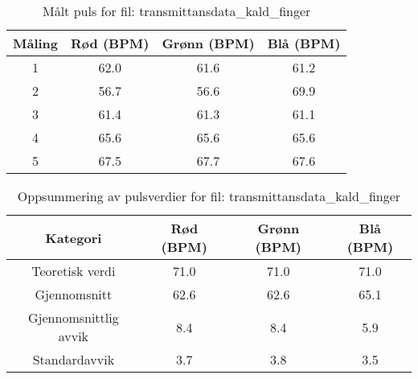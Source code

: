 
\begin{table}[H]
\centering
\caption{Målt puls for fil: transmittansdata\_kald\_finger}
\label{tab:transmittansdata\_kald\_finger}
\begin{tabular}{|c|c|c|c|}
\hline
\textbf{Måling} & \textbf{Rød (BPM)} & \textbf{Grønn (BPM)} & \textbf{Blå (BPM)} \\ \hline
1 & 62.0 & 61.6 & 61.2 \\ \hline
2 & 56.7 & 56.6 & 69.9 \\ \hline
3 & 61.4 & 61.3 & 61.1 \\ \hline
4 & 65.6 & 65.6 & 65.6 \\ \hline
5 & 67.5 & 67.7 & 67.6 \\ \hline
\end{tabular}
\end{table}

\begin{table}[H]
\centering
\caption{Oppsummering av pulsverdier for fil: transmittansdata\_kald\_finger}
\label{tab:transmittansdata\_kald\_finger_summary}
\begin{tabular}{|c|c|c|c|}
\hline
\textbf{Kategori} & \textbf{Rød (BPM)} & \textbf{Grønn (BPM)} & \textbf{Blå (BPM)} \\ \hline
Teoretisk verdi & 71.0 & 71.0 & 71.0 \\ \hline
Gjennomsnitt & 62.6 & 62.6 & 65.1 \\ \hline
Gjennomsnittlig avvik & 8.4 & 8.4 & 5.9 \\ \hline
Standardavvik & 3.7 & 3.8 & 3.5 \\ \hline
\end{tabular}
\end{table}